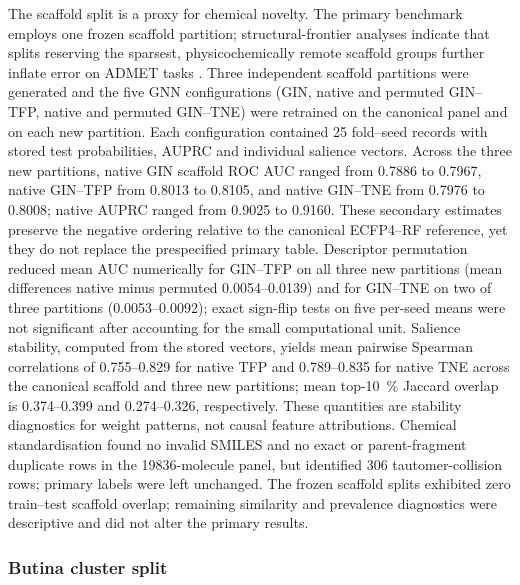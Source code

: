 \documentclass[11pt,a4paper]{article}
\begin{document}
The scaffold split is a proxy for chemical novelty. The primary benchmark employs one frozen scaffold partition; structural-frontier analyses indicate that splits reserving the sparsest, physicochemically remote scaffold groups further inflate error on ADMET tasks \citep{scaffold_frontier_2026}. Three independent scaffold partitions were generated and the five GNN configurations (GIN, native and permuted GIN--TFP, native and permuted GIN--TNE) were retrained on the canonical panel and on each new partition. Each configuration contained \num{25} fold--seed records with stored test probabilities, AUPRC and individual salience vectors. Across the three new partitions, native GIN scaffold ROC AUC ranged from \num{0.7886} to \num{0.7967}, native GIN--TFP from \num{0.8013} to \num{0.8105}, and native GIN--TNE from \num{0.7976} to \num{0.8008}; native AUPRC ranged from \num{0.9025} to \num{0.9160}. These secondary estimates preserve the negative ordering relative to the canonical ECFP4--RF reference, yet they do not replace the prespecified primary table. Descriptor permutation reduced mean AUC numerically for GIN--TFP on all three new partitions (mean differences native minus permuted \num{0.0054}--\num{0.0139}) and for GIN--TNE on two of three partitions (\num{0.0053}--\num{0.0092}); exact sign-flip tests on five per-seed means were not significant after accounting for the small computational unit. Salience stability, computed from the stored vectors, yields mean pairwise Spearman correlations of \num{0.755}--\num{0.829} for native TFP and \num{0.789}--\num{0.835} for native TNE across the canonical scaffold and three new partitions; mean top-\qty{10}{\percent} Jaccard overlap is \num{0.374}--\num{0.399} and \num{0.274}--\num{0.326}, respectively. These quantities are stability diagnostics for weight patterns, not causal feature attributions. Chemical standardisation found no invalid SMILES and no exact or parent-fragment duplicate rows in the \num{19836}-molecule panel, but identified \num{306} tautomer-collision rows; primary labels were left unchanged. The frozen scaffold splits exhibited zero train--test scaffold overlap; remaining similarity and prevalence diagnostics were descriptive and did not alter the primary results.

\subsubsection{Butina cluster split}
\end{document}
